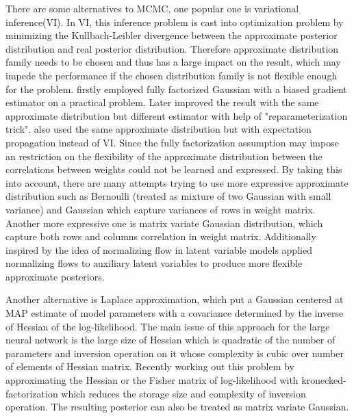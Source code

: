 There are some alternatives to MCMC, one popular one is variational inference(VI)\cite{hinton1993keeping}. In VI, this inference problem is cast into optimization problem by minimizing the Kullbach-Leibler divergence between the approximate posterior distribution and real posterior distribution. Therefore approximate distribution family needs to be chosen and thus has a large impact on the result, which may impede the performance if the chosen distribution family is not flexible enough for the problem. \cite{graves2011practical} firstly employed fully factorized Gaussian with a biased gradient estimator on a practical problem. Later \cite{blundell2015weight} improved the result with the same approximate distribution but different estimator with help of "reparameterization trick"\cite{kingma2013auto}. \citealp{hernandez2015probabilistic} also used the same approximate distribution but with expectation propagation\cite{minka2001expectation} instead of VI.
Since the fully factorization assumption may impose an restriction on the flexibility of the approximate distribution between the correlations between weights could not be learned and expressed. By taking this into account, there are many attempts trying to use more expressive approximate distribution such as Bernoulli (treated as mixture of two Gaussian with small variance)\cite{gal2016dropout} and Gaussian \cite{kingma2015variational} which capture variances of rows in weight matrix. Another more expressive one is matrix variate Gaussian distribution\cite{louizos2016structured}\cite{sun2017learning}\cite{zhang2017noisy}, which capture both rows and columns correlation in weight matrix. Additionally inspired by the idea of normalizing flow in latent variable models \cite{louizos2017multiplicative}applied normalizing
flows to auxiliary latent variables to produce more
flexible approximate posteriors. 


Another alternative is Laplace approximation\cite{mackay1992practical}, which put a Gaussian centered at MAP estimate of model parameters with a covariance determined by the inverse of Hessian of the log-likelihood. The main issue of this approach for the large neural network is the large size of Hessian which is quadratic of the number of parameters and inversion operation on it whose complexity is cubic over number of elements of Hessian matrix. Recently \cite{ritter2018scalable} working out this problem by approximating the Hessian or the Fisher matrix of log-likelihood with kronecked-factorization which reduces the storage size and complexity of inversion operation. The resulting posterior can also be treated as matrix variate Gaussian.  

